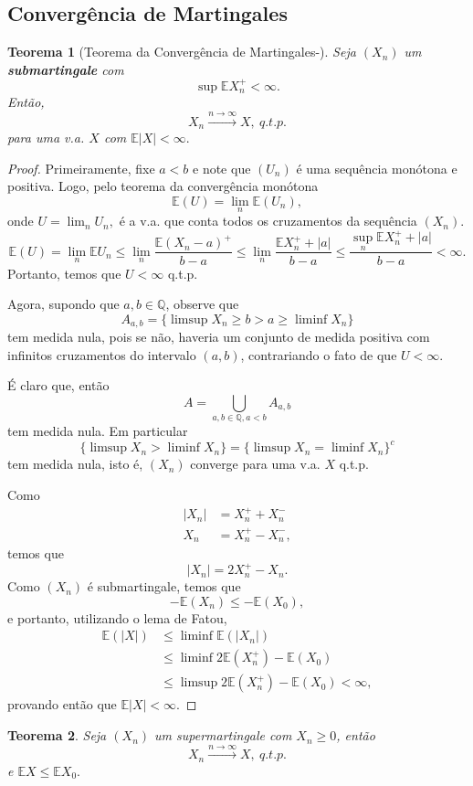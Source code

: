 \documentclass[12pt,a4paper,oneside]{book}
\newtheorem{theorem}{Teorema}[section]
\theoremstyle{definition}
\theoremstyle{remark}
\numberwithin{equation}{section}
\newcommand{\E}{\mathbb{E}}
\newcommand{\rarrowlimn}{\xrightarrow{n\rightarrow \infty}}
\begin{document}
\subsection{Convergência de Martingales}


\begin{theorem}[Teorema da Convergência de Martingales-\cite{durrett}]\label{teo-conv-martings} 
 Seja $(X_n)$ um \textbf{submartingale} com 
$$ \sup \E X_n^+ <\infty. $$
Então, 
$$X_n \rarrowlimn X,\ q.t.p. $$
para uma v.a. $X$ com $\E|X|<\infty.$
\end{theorem}
\begin{proof}
Primeiramente, fixe $a<b$ e note que $(U_n)$ é uma sequência monótona e positiva. Logo, pelo teorema da convergência monótona
$$\E(U) = \lim_n\E(U_n), $$
onde $U = \lim_n U_n,$ é a v.a. que conta todos os cruzamentos da sequência $(X_n).$
$$\E(U) = \lim_n\E U_n \leq\lim_n \dfrac{\E(X_n-a)^+}{b-a}\leq \lim_n\dfrac{\E X_n^+ + |a|}{b-a}\leq \dfrac{\sup_n \E X_n^+ + |a|}{b-a}<\infty.$$
Portanto, temos que $U<\infty$ q.t.p.

Agora, supondo que $a,b\in \mathbb{Q}$, observe que
$$A_{a,b}= \{ \limsup X_n \geq b>a\geq \liminf X_n \}$$
tem medida nula, pois se não, haveria um conjunto de medida positiva com infinitos cruzamentos do intervalo $(a,b)$, contrariando o fato de que $U<\infty.$

É claro que, então 
$$A = \bigcup_{a,b\in \mathbb{Q},a<b} A_{a,b} $$
tem medida nula. Em particular
$$\{\limsup X_n > \liminf X_n \} =\{\limsup X_n = \liminf X_n\}^c $$
tem medida nula, isto é, $(X_n)$ converge para uma v.a. $X$ q.t.p.

Como
\begin{align*}
 |X_n| &= X_n^+ + X_n^-\\
 X_n   &= X_n^+ - X_n^-, 
\end{align*}
temos que
$$|X_n| = 2X_n^+ - X_n. $$
Como $(X_n)$ é submartingale, temos que
$$-\E(X_n) \leq -\E(X_0),$$
e portanto, utilizando o lema de Fatou,
\begin{align*}
\E(|X|) &\leq \liminf\E(|X_n|)\\
& \leq \liminf 2\E(X_n^+) - \E(X_0)\\
& \leq \limsup 2\E(X_n^+) - \E(X_0)<\infty,
\end{align*}
provando então que $\E|X|<\infty.$
\end{proof}



\begin{theorem}
Seja $(X_n)$ um supermartingale com $X_n\geq 0$, então 
$$X_n \rarrowlimn X,\ q.t.p.$$
e $\E X\leq \E X_0.$
\end{theorem}
\end{document}
